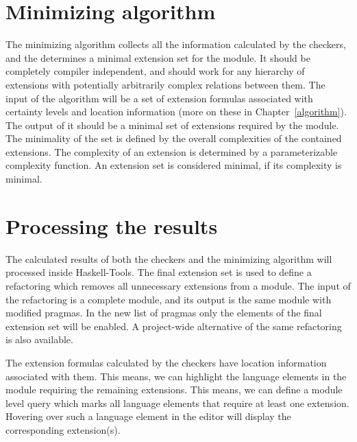 \documentclass[main.tex]{subfiles}
\begin{document}
	\section{Minimizing algorithm}
	
	The minimizing algorithm collects all the information calculated by the checkers, and the determines a minimal extension set for the module. It should be completely compiler independent, and should work for any hierarchy of extensions with potentially arbitrarily complex relations between them. The input of the algorithm will be a set of extension formulas associated with certainty levels and location information (more on these in Chapter~\ref{algorithm}). The output of it should be a minimal set of extensions required by the module. The minimality of the set is defined by the overall complexities of the contained extensions. The complexity of an extension is determined by a parameterizable complexity function. An extension set is considered minimal, if its complexity is minimal.
	
	\section{Processing the results}
	
	The calculated results of both the checkers and the minimizing algorithm will processed inside Haskell-Tools. The final extension set is used to define a refactoring which removes all unnecessary extensions from a module. The input of the refactoring is a complete module, and its output is the same module with modified  pragmas. In the new list of pragmas only the elements of the final extension set will be enabled. A project-wide alternative of the same refactoring is also available. 
	
	The extension formulas calculated by the checkers have location information associated with them. This means, we can highlight the language elements in the module requiring the remaining extensions. This means, we can define a module level query which marks all language elements that require at least one extension. Hovering over such a language element in the editor will display the corresponding extension(s).
	
\end{document}

